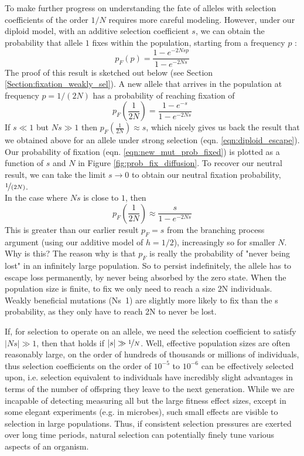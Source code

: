 {To make further progress on understanding the fate of alleles with
selection coefficients of the order $1/N$ requires more careful
modeling. However, under our diploid model, with an additive selection coefficient $s$, we can obtain the probability that allele $1$ fixes within the population, starting
from a frequency $p$ :
\begin{equation}
p_F(p) = \frac{1-e^{-2Ns p }}{1-e^{-2Ns}} \label{eqn:prob_fixed}
\end{equation}
The proof of this result is sketched out below (see Section \ref{Section:fixation_weakly_sel}). A new allele that arrives in the population at frequency $p=1/(2N)$ has a probability of reaching fixation of
\begin{equation}
p_F \left(\frac{1}{2N} \right) = \frac{1-e^{-s }}{1-e^{-2Ns}} \label{eqn:new_mut_prob_fixed}
\end{equation}
If $s \ll1$ but $Ns \gg 1$ then $p_F(\frac{1}{2N}) \approx s$, which
nicely gives
us back the result that we obtained above for an allele under strong selection
(eqn. \eqref{eqn:diploid_escape}). Our probability of fixation
(eqn. \eqref{eqn:new_mut_prob_fixed}) is plotted as a function of $s$
and $N$ in Figure \ref{fig:prob_fix_diffusion}. To recover our neutral
result, we can take the
limit $s \rightarrow 0$ to obtain our neutral fixation
probability, $\nicefrac{1}{(2N)}$. \\

In the case where $Ns$ is close to $1$, then
\begin{equation}
p_F \left( \frac{1}{2N} \right) \approx \frac{s}{1-e^{-2Ns}} \label{eqn:escape_from_intro}
\end{equation}
This is greater than our earlier result $p_F=s$ from the branching process
argument (using our additive model of $h=1/2$), increasingly so for smaller $N$. 
Why is this?  The reason why is that $p_F$ is really the probability
of "never being lost" in an infinitely large population. So to persist
indefinitely, the allele has to escape loss permanently, by never being
absorbed by the zero state. When the population size is finite, to fix
we only need to reach a size 2N individuals. Weakly beneficial
mutations (Ns~1) are slightly more likely to fix than the s
probability, as they only have to reach 2N to never be lost.

If, for selection to operate on an allele, we need the selection coefficient to satisfy
$|Ns|\gg 1$, then that holds if $|s|\gg \nicefrac{1}{N}$. 
Well, effective population sizes are often reasonably large, on the
order of hundreds of thousands or millions of individuals, thus selection
coefficients on the order of $10^{-5}$ to $10^{-6}$ can be effectively selected upon, i.e. selection
equivalent to individuals have incredibly slight advantages in terms
of the number of offspring they leave to the next generation.
While we are incapable of detecting measuring all but the large fitness effect sizes,  
except in some elegant experiments (e.g. in microbes), such small effects are visible to
selection in large populations. Thus, if consistent selection pressures are exerted over long
time periods, natural selection can potentially finely tune various aspects of an organism.

}

